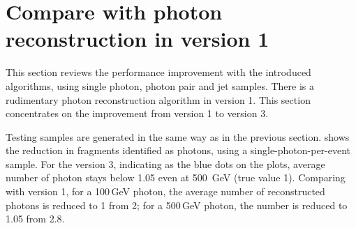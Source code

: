 \section{Compare with photon reconstruction in \pandora version 1}
\label{sec:photonPerformanceCompare}

This section reviews the performance improvement with the introduced algorithms, using single photon, photon pair and jet samples. There is a rudimentary photon reconstruction algorithm in \pandora version 1. This section concentrates on the improvement from \pandora version 1 to version 3.




Testing samples are generated in the same way as in the previous section.  shows the reduction in fragments identified as photons, using a single-photon-per-event sample. For the \pandora version 3, indicating as the blue dots on the plots, average number of photon stays below 1.05 even at 500 \,GeV (true value 1). Comparing with \pandora version 1, for a 100\,GeV photon, the average number of reconstructed photons is reduced to 1 from 2; for a 500\,GeV photon, the  number is reduced to 1.05 from 2.8.

